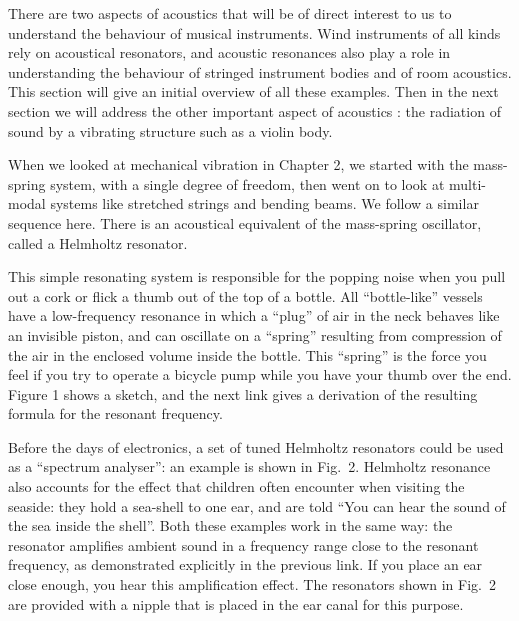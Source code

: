 

  There are two aspects of acoustics that will be of direct interest to us to 
  understand the behaviour of musical instruments. Wind instruments of all 
  kinds rely on acoustical resonators, and acoustic resonances also play a role 
  in understanding the behaviour of stringed instrument bodies and of room 
  acoustics. This section will give an initial overview of all these examples. 
  Then in the next section we will address the other important aspect of 
  acoustics : the radiation of sound by a vibrating structure such as a violin 
  body. 

  When we looked at mechanical vibration in Chapter 2, we started with the 
  mass-spring system, with a single degree of freedom, then went on to look at 
  multi-modal systems like stretched strings and bending beams. We follow a 
  similar sequence here. There is an acoustical equivalent of the mass-spring 
  oscillator, called a Helmholtz resonator. 


  This simple resonating system is responsible for the popping noise when you 
  pull out a cork or flick a thumb out of the top of a bottle. All 
  “bottle-like” vessels have a low-frequency resonance in which a “plug” of air 
  in the neck behaves like an invisible piston, and can oscillate on a “spring” 
  resulting from compression of the air in the enclosed volume inside the 
  bottle. This ``spring'' is the force you feel if you try to operate a bicycle 
  pump while you have your thumb over the end. Figure 1 shows a sketch, and the 
  next link gives a derivation of the resulting formula for the resonant 
  frequency. 


  Before the days of electronics, a set of tuned Helmholtz resonators could be 
  used as a “spectrum analyser”: an example is shown in Fig.\ 2. Helmholtz 
  resonance also accounts for the effect that children often encounter when 
  visiting the seaside: they hold a sea-shell to one ear, and are told ``You 
  can hear the sound of the sea inside the shell''. Both these examples work in 
  the same way: the resonator amplifies ambient sound in a frequency range 
  close to the resonant frequency, as demonstrated explicitly in the previous 
  link. If you place an ear close enough, you hear this amplification effect. 
  The resonators shown in Fig.\ 2 are provided with a nipple that is placed in 
  the ear canal for this purpose. 

